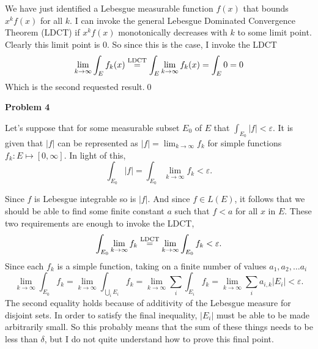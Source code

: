 We have just identified a Lebesgue measurable function $f(x)$ that bounds $x^kf(x)$ for all $k$.
I can invoke the general Lebesgue Dominated Convergence Theorem (LDCT) if $x^kf(x)$ monotonically decreases with $k$ to some limit point.
Clearly this limit point is $0$.
So since this is the case, I invoke the LDCT
$$\lim_{k\to\infty}\int_Ef_k(x)\buildrel\rm LDCT\over =\int_E\lim_{k\to\infty}f_k(x)=\int_E0=0$$
Which is the second requested result.\hfill\qed\kern3pt{}


\eject
{\bf Problem 4}


Let's suppose that for some measurable subset $E_0$ of $E$ that $\int_{E_0}|f|<\varepsilon$.
It is given that $|f|$ can be represented as $|f|=\lim_{k\to\infty}f_k$ for simple functions $f_k:E\mapsto[0,\infty]$.
In light of this,
$$\int_{E_0}|f|=\int_{E_0}\lim_{k\to\infty}f_k<\varepsilon.$$

Since $f$ is Lebesgue integrable so is $|f|$.
And since $f\in L(E)$, it follows that we should be able to find some finite constant $a$ such that $f<a$ for all $x$ in $E$.
These two requirements are enough to invoke the LDCT,
$$\int_{E_0}\lim_{k\to\infty}f_k\buildrel\rm LDCT\over =\lim_{k\to\infty}\int_{E_0}f_k<\varepsilon.$$
Since each $f_k$ is a simple function, taking on a finite number of values $a_1,a_2,\ldots a_i$
$$\lim_{k\to\infty}\int_{E_0}f_k=\lim_{k\to\infty}\int_{\bigcup_i E_i}f_k=\lim_{k\to\infty}\sum_i\int_{E_i}f_k=\lim_{k\to\infty}\sum_ia_{i,k}|E_i|<\varepsilon.$$
The second equality holds because of additivity of the Lebesgue measure for disjoint sets.
In order to satisfy the final inequality, $|E_i|$ must be able to be made arbitrarily small.
So this probably means that the sum of these things needs to be less than $\delta$, but I do not quite understand how to prove this final point.
\bye
